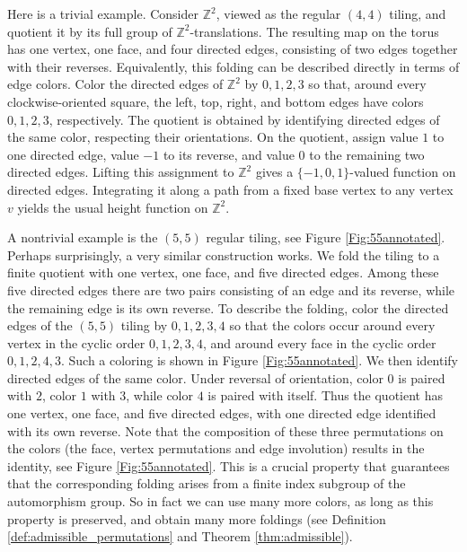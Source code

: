 \documentclass[11pt]{article}
\theoremstyle{remark}
\newcommand{\Z}{\mathbb Z}
\begin{document}
Here is a trivial example. Consider $\Z^2$, viewed as the regular $(4,4)$ tiling, and quotient it by its full group of $\Z^2$-translations. The resulting map on the torus has one vertex, one face, and four directed edges, consisting of two edges together with their reverses. Equivalently, this folding can be described directly in terms of edge colors. Color the directed edges of $\Z^2$ by ${0,1,2,3}$ so that, around every clockwise-oriented square, the left, top, right, and bottom edges have colors $0,1,2,3$, respectively. The quotient is obtained by identifying directed edges of the same color, respecting their orientations. On the quotient, assign value $1$ to one directed edge, value $-1$ to its reverse, and value $0$ to the remaining two directed edges. Lifting this assignment to $\Z^2$ gives a $\{-1,0,1\}$-valued function on directed edges. Integrating it along a path from a fixed base vertex to any vertex $v$ yields the usual height function on $\Z^2$.

A nontrivial example is the 
$(5,5)$ regular tiling, see Figure \ref{Fig:55annotated}. Perhaps surprisingly, a very similar construction works. We fold the tiling to a finite quotient with one vertex, one face, and five directed edges. Among these five directed edges there are two pairs consisting of an edge and its reverse, while the remaining edge is its own reverse. To describe the folding, color the directed edges of the $(5,5)$ tiling by ${0,1,2,3,4}$ so that the colors occur around every vertex in the cyclic order $0,1,2,3,4$, and around every face in the cyclic order $0,1,2,4,3$. Such a coloring is shown in Figure \ref{Fig:55annotated}. We then identify directed edges of the same color. Under reversal of orientation, color $0$ is paired with $2$, color $1$ with $3$, while color $4$ is paired with itself. Thus the quotient has one vertex, one face, and five directed edges, with one directed edge identified with its own reverse. Note that the composition of these three permutations on the colors (the face, vertex permutations and edge involution) results in the identity, see Figure \ref{Fig:55annotated}. This is a crucial property that guarantees that the corresponding folding arises from a finite index subgroup of the automorphism group. So in fact we can use many more colors, as long as this property is preserved, and obtain many more foldings (see Definition \ref{def:admissible_permutations} and Theorem \ref{thm:admissible}).
\end{document}
